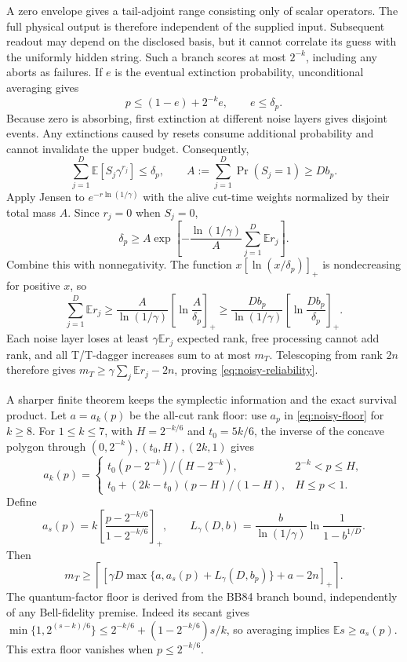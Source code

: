 \documentclass[11pt,a4paper]{article}
\newcommand{\E}{\mathbb E}
\begin{document}
A zero envelope gives a tail-adjoint range consisting only of scalar operators. The full physical output is therefore independent of the supplied input. Subsequent readout may depend on the disclosed basis, but it cannot correlate its guess with the uniformly hidden string. Such a branch scores at most $2^{-k}$, including any aborts as failures. If $e$ is the eventual extinction probability, unconditional averaging gives
\[
p\le(1-e)+2^{-k}e,\qquad e\le\delta_p.
\]
Because zero is absorbing, first extinction at different noise layers gives disjoint events. Any extinctions caused by resets consume additional probability and cannot invalidate the upper budget. Consequently,
\[
\sum_{j=1}^D\E[S_j\gamma^{r_j}]\le\delta_p,
\qquad A:=\sum_{j=1}^D\Pr(S_j=1)\ge D b_p.
\]
Apply Jensen to $e^{-r\ln(1/\gamma)}$ with the alive cut-time weights normalized by their total mass $A$. Since $r_j=0$ when $S_j=0$,
\[
\delta_p\ge A\exp\!\left[-\frac{\ln(1/\gamma)}{A}
\sum_{j=1}^D\E r_j\right].
\]
Combine this with nonnegativity. The function $x[\ln(x/\delta_p)]_+$ is nondecreasing for positive $x$, so
\[
\sum_{j=1}^D\E r_j\ge
\frac{A}{\ln(1/\gamma)}\left[\ln\frac{A}{\delta_p}\right]_+
\ge\frac{D b_p}{\ln(1/\gamma)}
\left[\ln\frac{D b_p}{\delta_p}\right]_+.
\]
Each noise layer loses at least $\gamma\E r_j$ expected rank, free processing cannot add rank, and all T/T-dagger increases sum to at most $m_T$. Telescoping from rank $2n$ therefore gives $m_T\ge\gamma\sum_j\E r_j-2n$, proving \eqref{eq:noisy-reliability}.

A sharper finite theorem keeps the symplectic information and the exact survival product. Let $a=a_k(p)$ be the all-cut rank floor: use $a_p$ in \eqref{eq:noisy-floor} for $k\ge8$. For $1\le k\le7$, with $H=2^{-k/6}$ and $t_0=5k/6$, the inverse of the concave polygon through $(0,2^{-k}),(t_0,H),(2k,1)$ gives
\[
a_k(p)=\begin{cases}
t_0(p-2^{-k})/(H-2^{-k}),&2^{-k}<p\le H,\\
t_0+(2k-t_0)(p-H)/(1-H),&H\le p<1.
\end{cases}
\]
Define
\[
a_s(p)=k\left[\frac{p-2^{-k/6}}{1-2^{-k/6}}\right]_+,\qquad
L_\gamma(D,b)=\frac{b}{\ln(1/\gamma)}\ln\frac1{1-b^{1/D}}.
\]
Then
\begin{equation}
\boxed{m_T\ge\left\lceil\left[
\gamma D\max\{a,a_s(p)+L_\gamma(D,b_p)\}+a-2n
\right]_+\right\rceil.}
\label{eq:noisy-reliability-sharp}
\end{equation}
The quantum-factor floor is derived from the BB84 branch bound, independently of any Bell-fidelity premise. Indeed its secant gives
$\min\{1,2^{(s-k)/6}\}\le2^{-k/6}+(1-2^{-k/6})s/k$, so averaging implies $\E s\ge a_s(p)$. This extra floor vanishes when $p\le2^{-k/6}$.
\end{document}
